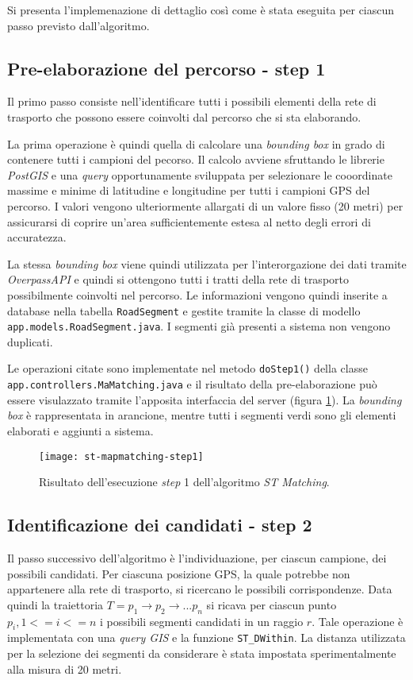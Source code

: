 Si presenta l'implemenazione di dettaglio così come è stata eseguita per ciascun passo previsto dall'algoritmo.

\subsection{Pre-elaborazione del percorso - step 1}
Il primo passo consiste nell'identificare tutti i possibili elementi della rete di trasporto che possono essere coinvolti dal percorso che si sta elaborando.

La prima operazione è quindi quella di calcolare una \emph{bounding box} in grado di contenere tutti i campioni del pecorso. Il calcolo avviene sfruttando le librerie \emph{PostGIS} e una \emph{query} opportunamente sviluppata per selezionare le cooordinate massime e minime di latitudine e longitudine per tutti i campioni GPS del percorso. I valori vengono ulteriormente allargati di un valore fisso (20 metri) per assicurarsi di coprire un'area sufficientemente estesa al netto degli errori di accuratezza.

La stessa \emph{bounding box} viene quindi utilizzata per l'interorgazione dei dati tramite \emph{OverpassAPI} e quindi si ottengono tutti i tratti della rete di trasporto possibilmente coinvolti nel percorso. Le informazioni vengono quindi inserite a database nella tabella \texttt{RoadSegment} e gestite tramite la classe di modello \texttt{app.\-models.\-RoadSegment.java}. I segmenti già presenti a sistema non vengono duplicati. 

Le operazioni citate sono implementate nel metodo \texttt{doStep1()} della classe \texttt{app.\-controllers.\-MaMatching.java} e il risultato della pre-elaborazione può essere visulazzato tramite l'apposita interfaccia del server (figura \ref{fig:st-mapmatching-step1}). La \emph{bounding box} è rappresentata in arancione, mentre tutti i segmenti verdi sono gli elementi elaborati e aggiunti a sistema.

\begin{figure}[h]
  \centering
  \texttt{[image: st-mapmatching-step1]}
  \caption{\footnotesize{Risultato dell'esecuzione \emph{step} 1 dell'algoritmo \emph{ST Matching}.}}
  \label{fig:st-mapmatching-step1}
\end{figure}

\subsection{Identificazione dei candidati - step 2}
Il passo successivo dell'algoritmo è l'individuazione, per ciascun campione, dei possibili candidati. Per ciascuna posizione GPS, la quale potrebbe non appartenere alla rete di trasporto, si ricercano le possibili corrispondenze. Data quindi la traiettoria $T=p_1 \rightarrow p_2 \rightarrow ... p_n$ si ricava per ciascun punto $p_i, 1 <= i <= n$ i possibili segmenti candidati in un raggio $r$. Tale operazione è implementata con una \emph{query GIS} e la funzione \texttt{ST\_DWithin}. La distanza utilizzata per la selezione dei segmenti da considerare è stata impostata sperimentalmente alla misura di 20 metri. 


